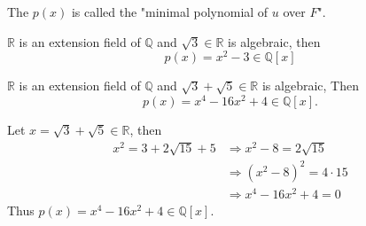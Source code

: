 \begin{remark}
    The $p(x)$ is called the "minimal polynomial of $u$ over $F$".
\end{remark}

\begin{example}
    $\mathbb{R}$ is an extension field of $\mathbb{Q}$ and $\sqrt{3} \in \mathbb{R}$ is algebraic,
    then
    \[
        p(x) = x^2 - 3 \in \mathbb{Q}[x]
    \]
\end{example}

\begin{example}
    $\mathbb{R}$ is an extension field of $\mathbb{Q}$ and $\sqrt{3} + \sqrt{5} \in \mathbb{R}$ is algebraic,
    Then
    \[
        p(x) = x^4 - 16x^2 + 4 \in \mathbb{Q}[x].
    \]
\end{example}
\begin{solution}
    Let $x = \sqrt{3} + \sqrt{5} \in \mathbb{R}$, then 
    \begin{align*}
        x^2 = 3 + 2\sqrt{15} + 5 &\Rightarrow x^2 - 8 = 2\sqrt{15}\\
        &\Rightarrow (x^2 - 8)^2 = 4 \cdot 15\\
        &\Rightarrow x^4 - 16x^2 + 4 = 0
    \end{align*}
    Thus $p(x) = x^4 - 16x^2 + 4 \in \mathbb{Q}[x]$.
\end{solution}

